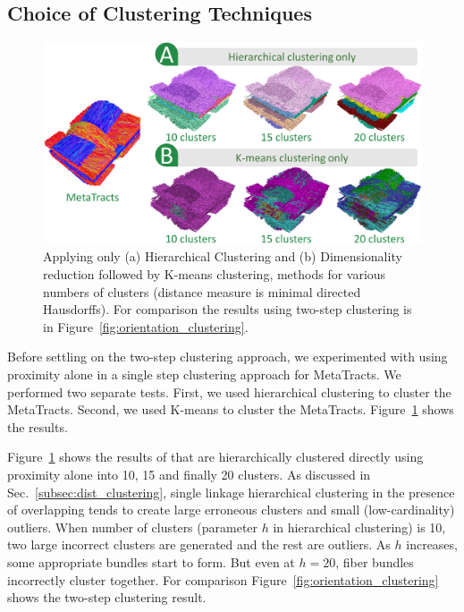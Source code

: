 \subsection{Choice of Clustering Techniques}\label{subsec:clus_choice}
\begin{figure}[t]
	\centering
	\includegraphics[width=\linewidth]{images/comparison_all.eps}
	\caption{Applying only (a) Hierarchical Clustering and (b) Dimensionality reduction followed by K-means clustering, methods for various numbers of clusters (distance measure is minimal directed Hausdorffs).
		For comparison the results using two-step clustering is in Figure~\ref{fig:orientation_clustering}.}
	\label{fig:comparison}
\end{figure} 
Before settling on the two-step clustering approach, we experimented with using proximity alone in a single step clustering approach for MetaTracts. We performed two separate tests. First, we used hierarchical clustering to cluster the MetaTracts. Second, we used K-means to cluster the MetaTracts.
Figure~\ref{fig:comparison} shows the results.


Figure~\ref{fig:comparison} shows the results of \mt that are hierarchically clustered directly using proximity alone into 10, 15 and finally 20 clusters. 
As discussed in Sec.~\ref{subsec:dist_clustering}, single linkage hierarchical clustering in the presence of overlapping \mt tends to create large erroneous clusters and small (low-cardinality) outliers.
When number of clusters (parameter $h$ in hierarchical clustering) is 10, two large incorrect clusters are generated and the rest are outliers. As $h$ increases, some appropriate bundles start to form. But even at $h=20$, fiber bundles incorrectly cluster together. For comparison Figure~\ref{fig:orientation_clustering} shows the two-step clustering result. 


